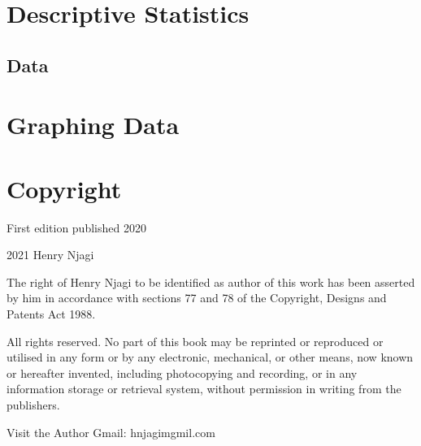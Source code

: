 \documentclass[
]{book}
\begin{document}
\hypertarget{descriptive-statistics}{%
\chapter{Descriptive Statistics}\label{descriptive-statistics}}

\hypertarget{data}{%
\section{Data}\label{data}}

\hypertarget{graphing-data}{%
\chapter{Graphing Data}\label{graphing-data}}

\hypertarget{copyright}{%
\chapter{Copyright}\label{copyright}}

First edition published 2020

2021 Henry Njagi

The right of Henry Njagi to be identified as author of this work has been asserted by him in accordance with sections 77 and 78 of the Copyright, Designs and Patents Act 1988.

All rights reserved. No part of this book may be reprinted or reproduced or utilised in any form or by any electronic, mechanical, or other means, now known or hereafter invented, including photocopying and recording, or in any information storage or retrieval system, without permission in writing from the publishers.

Visit the Author Gmail: hnjagimgmil.com

  
\end{document}
